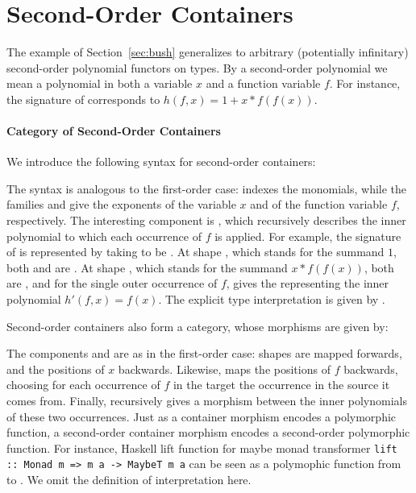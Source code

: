 \section{Second-Order Containers}
\label{sec:second}

The example of Section~\ref{sec:bush} generalizes to arbitrary (potentially infinitary) second-order polynomial functors on types. By a second-order polynomial we mean a polynomial in both a variable $x$ and a function variable $f$. For instance, the signature of  corresponds to $h (f , x) = 1 + x * f (f (x))$.

\newpage

\paragraph*{Category of Second-Order Containers}

We introduce the following syntax for second-order containers:



The syntax is analogous to the first-order case:  indexes the monomials, while the families  and  give the exponents of the variable $x$ and of the function variable $f$, respectively. The interesting component is , which recursively describes the inner polynomial to which each occurrence of $f$ is applied. For example, the signature of  is represented by taking  to be . At shape , which stands for the summand $1$, both  and  are . At shape , which stands for the summand $x * f (f (x))$, both are , and for the single outer occurrence of $f$,  gives the  representing the inner polynomial $h' (f , x) = f (x)$. The explicit type interpretation is given by .

Second-order containers also form a category, whose morphisms are given by:



The components  and  are as in the first-order case: shapes are mapped forwards, and the positions of $x$ backwards. Likewise,  maps the positions of $f$ backwards, choosing for each occurrence of $f$ in the target the occurrence in the source it comes from. Finally,  recursively gives a morphism between the inner polynomials of these two occurrences. Just as a container morphism encodes a polymorphic function, a second-order container morphism encodes a second-order polymorphic function. For instance, Haskell lift function for maybe monad transformer \texttt{lift :: Monad m => m a -> MaybeT m a} can be seen as a polymophic function from  to . We omit the definition of interpretation here.

